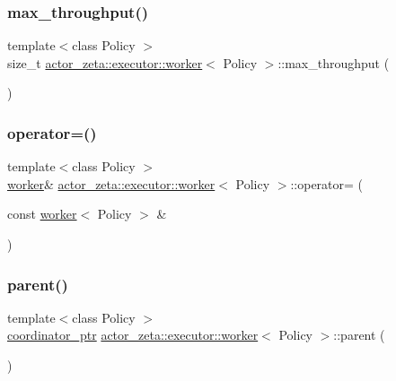 \subsubsection{\texorpdfstring{max\+\_\+throughput()}{max\_throughput()}}
{\footnotesize\ttfamily template$<$class Policy $>$ \\
size\+\_\+t \hyperlink{classactor__zeta_1_1executor_1_1worker}{actor\+\_\+zeta\+::executor\+::worker}$<$ Policy $>$\+::max\+\_\+throughput (\begin{DoxyParamCaption}{ }\end{DoxyParamCaption})\hspace{0.3cm}{\ttfamily [inline]}}

\mbox{\label{classactor__zeta_1_1executor_1_1worker_a5ee4aa24cacffc8f620ea0094b4dbada}} 
\subsubsection{\texorpdfstring{operator=()}{operator=()}}
{\footnotesize\ttfamily template$<$class Policy $>$ \\
\hyperlink{classactor__zeta_1_1executor_1_1worker}{worker}\& \hyperlink{classactor__zeta_1_1executor_1_1worker}{actor\+\_\+zeta\+::executor\+::worker}$<$ Policy $>$\+::operator= (\begin{DoxyParamCaption}\item[{const \hyperlink{classactor__zeta_1_1executor_1_1worker}{worker}$<$ Policy $>$ \&}]{ }\end{DoxyParamCaption})\hspace{0.3cm}{\ttfamily [delete]}}

\mbox{\label{classactor__zeta_1_1executor_1_1worker_aa3f0840f8fa873ff6300e72cbf753cfd}} 
\subsubsection{\texorpdfstring{parent()}{parent()}}
{\footnotesize\ttfamily template$<$class Policy $>$ \\
\hyperlink{classactor__zeta_1_1executor_1_1worker_a0f64bbb63577325b5217ccee17a28738}{coordinator\+\_\+ptr} \hyperlink{classactor__zeta_1_1executor_1_1worker}{actor\+\_\+zeta\+::executor\+::worker}$<$ Policy $>$\+::parent (\begin{DoxyParamCaption}{ }\end{DoxyParamCaption})\hspace{0.3cm}{\ttfamily [inline]}}

